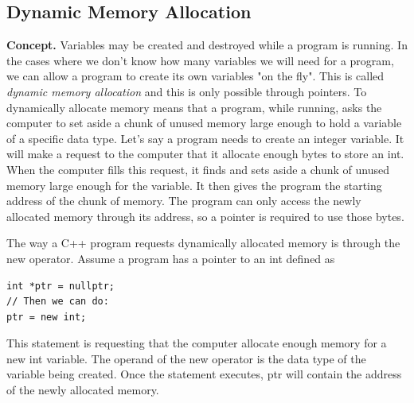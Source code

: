 \documentclass{report}
\begin{document}
    \bigbreak \noindent 
    \subsection{Dynamic Memory Allocation}
    \bigbreak \noindent 
    \textbf{Concept.} Variables may be created and destroyed while a program is running.
    \bigbreak \noindent 
    In the cases where we don't know how many variables we will need for a program, we can allow a program to create its own variables "on the fly". This is called \textit{dynamic memory allocation} and this is only possible through pointers.
    \bigbreak \noindent 
    To dynamically allocate memory means that a program, while running, asks the computer
to set aside a chunk of unused memory large enough to hold a variable of a specific data
type. Let’s say a program needs to create an integer variable. It will make a request to the
computer that it allocate enough bytes to store an int. When the computer fills this request,
it finds and sets aside a chunk of unused memory large enough for the variable. It then gives
the program the starting address of the chunk of memory. The program can only access the
newly allocated memory through its address, so a pointer is required to use those bytes.

    \bigbreak \noindent 
    The way a C++ program requests dynamically allocated memory is through the new operator. Assume a program has a pointer to an int defined as
    \bigbreak \noindent 
    \sepline
    \begin{verbatim}
int *ptr = nullptr;
// Then we can do:
ptr = new int;
    \end{verbatim}
    \sepline

    \bigbreak \noindent 
    This statement is requesting that the computer allocate enough memory for a new int variable. The operand of the new operator is the data type of the variable being created. Once the statement executes, ptr will contain the address of the newly allocated memory.







    
\end{document}
